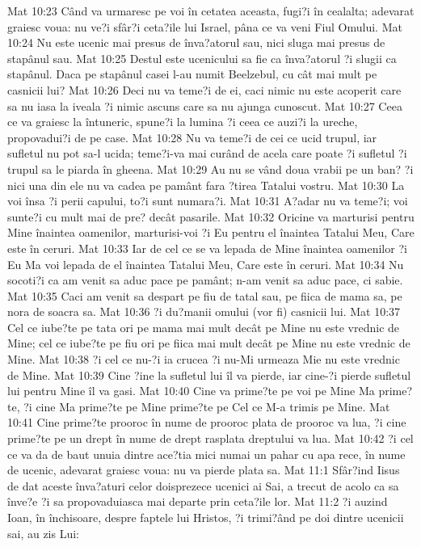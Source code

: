 Mat 10:23  Când va urmaresc pe voi în cetatea aceasta, fugi?i în cealalta; adevarat graiesc voua: nu ve?i sfâr?i ceta?ile lui Israel, pâna ce va veni Fiul Omului.
Mat 10:24  Nu este ucenic mai presus de înva?atorul sau, nici sluga mai presus de stapânul sau.
Mat 10:25  Destul este ucenicului sa fie ca înva?atorul ?i slugii ca stapânul. Daca pe stapânul casei l-au numit Beelzebul, cu cât mai mult pe casnicii lui?
Mat 10:26  Deci nu va teme?i de ei, caci nimic nu este acoperit care sa nu iasa la iveala ?i nimic ascuns care sa nu ajunga cunoscut.
Mat 10:27  Ceea ce va graiesc la întuneric, spune?i la lumina ?i ceea ce auzi?i la ureche, propovadui?i de pe case.
Mat 10:28  Nu va teme?i de cei ce ucid trupul, iar sufletul nu pot sa-l ucida; teme?i-va mai curând de acela care poate ?i sufletul ?i trupul sa le piarda în gheena.
Mat 10:29  Au nu se vând doua vrabii pe un ban? ?i nici una din ele nu va cadea pe pamânt fara ?tirea Tatalui vostru.
Mat 10:30  La voi însa ?i perii capului, to?i sunt numara?i.
Mat 10:31  A?adar nu va teme?i; voi sunte?i cu mult mai de pre? decât pasarile.
Mat 10:32  Oricine va marturisi pentru Mine înaintea oamenilor, marturisi-voi ?i Eu pentru el înaintea Tatalui Meu, Care este în ceruri.
Mat 10:33  Iar de cel ce se va lepada de Mine înaintea oamenilor ?i Eu Ma voi lepada de el înaintea Tatalui Meu, Care este în ceruri.
Mat 10:34  Nu socoti?i ca am venit sa aduc pace pe pamânt; n-am venit sa aduc pace, ci sabie.
Mat 10:35  Caci am venit sa despart pe fiu de tatal sau, pe fiica de mama sa, pe nora de soacra sa.
Mat 10:36  ?i du?manii omului (vor fi) casnicii lui.
Mat 10:37  Cel ce iube?te pe tata ori pe mama mai mult decât pe Mine nu este vrednic de Mine; cel ce iube?te pe fiu ori pe fiica mai mult decât pe Mine nu este vrednic de Mine.
Mat 10:38  ?i cel ce nu-?i ia crucea ?i nu-Mi urmeaza Mie nu este vrednic de Mine.
Mat 10:39  Cine ?ine la sufletul lui îl va pierde, iar cine-?i pierde sufletul lui pentru Mine îl va gasi.
Mat 10:40  Cine va prime?te pe voi pe Mine Ma prime?te, ?i cine Ma prime?te pe Mine prime?te pe Cel ce M-a trimis pe Mine.
Mat 10:41  Cine prime?te prooroc în nume de prooroc plata de prooroc va lua, ?i cine prime?te pe un drept în nume de drept rasplata dreptului va lua.
Mat 10:42  ?i cel ce va da de baut unuia dintre ace?tia mici numai un pahar cu apa rece, în nume de ucenic, adevarat graiesc voua: nu va pierde plata sa.
Mat 11:1  Sfâr?ind Iisus de dat aceste înva?aturi celor doisprezece ucenici ai Sai, a trecut de acolo ca sa înve?e ?i sa propovaduiasca mai departe prin ceta?ile lor.
Mat 11:2  ?i auzind Ioan, în închisoare, despre faptele lui Hristos, ?i trimi?ând pe doi dintre ucenicii sai, au zis Lui:
